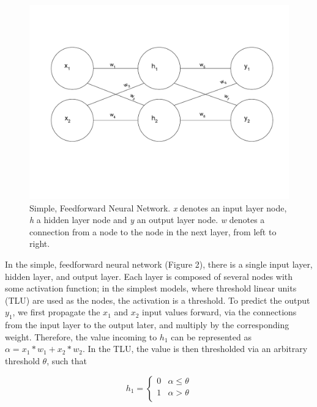 \documentclass[11pt]{article}
\begin{document}
\begin{figure}[H]
\begin{center}
\includegraphics[scale=0.5,trim={0 3cm 0 3cm},clip]{./Figures/smallNN.pdf}
\end{center}
\caption{Simple, Feedforward Neural Network. \textit{x} denotes an input layer node, \textit{h} a hidden layer node and \textit{y} an output layer node. \textit{w} denotes a connection from a node to the node in the next layer, from left to right.}
\end{figure}

In the simple, feedforward neural network (Figure 2), there is a single input layer, hidden layer, and output layer. Each layer is composed of several nodes with some activation function; in the simplest models, where threshold linear units (TLU) are used as the nodes, the activation is a threshold. To predict the output $y_1$, we first propagate the $x_1$ and $x_2$ input values forward, via the connections from the input layer to the output later, and multiply by the corresponding weight. Therefore, the value incoming to $h_1$ can be represented as $\alpha = x_1*w_1 + x_2*w_2$. In the TLU, the value is then thresholded via an arbitrary threshold $\theta$, such that 

\[ h_1 = \begin{cases}
	0 & \alpha \leq \theta\\
	1 & \alpha > \theta\\
	\end{cases}
\]
\end{document}
